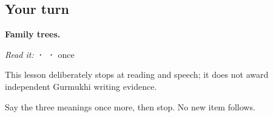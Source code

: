 \subsection*{Your turn}
\textbf{Family trees.}

\emph{Read it:} \textbf{ ·  · } once

This lesson deliberately stops at reading and speech; it does not award independent Gurmukhi writing evidence.

\begin{tcolorbox}[breakable,colback=teal!4,colframe=teal!35!black,title={Before you move on}]
Say the three meanings once more, then stop. No new item follows.
\end{tcolorbox}
